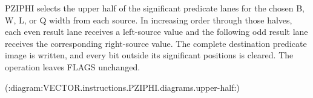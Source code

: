 PZIPHI selects the upper half of the significant predicate lanes for the chosen B, W, L, or Q width from each source.
In increasing order through those halves, each even result lane receives a left-source value and the following odd result lane receives the corresponding right-source value.
The complete destination predicate image is written, and every bit outside its significant positions is cleared.
The operation leaves FLAGS unchanged.

(:diagram:VECTOR.instructions.PZIPHI.diagrams.upper-half:)
